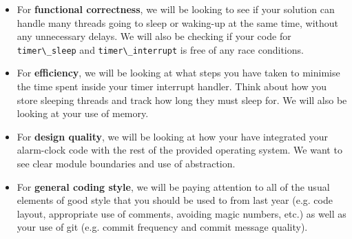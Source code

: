 \documentclass[a4paper,12pt]{article}
\newcommand{\shell}[1]{\lstinline!#1!}
\begin{document}
\begin{itemize}
  \item For \textbf{functional correctness}, we will be looking to see if your solution can handle many threads going to sleep or waking-up at the same time, without any unnecessary delays. 
  We will also be checking if your code for \shell{timer\_sleep} and \shell{timer\_interrupt} is free of any race conditions.
    
  \item For \textbf{efficiency}, we will be looking at what steps you have taken to minimise the time spent inside your timer interrupt handler. Think about how you store sleeping threads and track how long they must sleep for. We will also be looking at your use of memory.
    
  \item For \textbf{design quality}, we will be looking at how your have integrated your alarm-clock code with the rest of the provided operating system. We want to see clear module boundaries and use of abstraction.
 
  \item For \textbf{general coding style}, we will be paying attention to all of the usual elements of good style that you should be used to from last year (e.g. code layout, appropriate use of comments, avoiding magic numbers, etc.) as well as your use of git (e.g. commit frequency and commit message quality).
\end{itemize}











\end{document}
